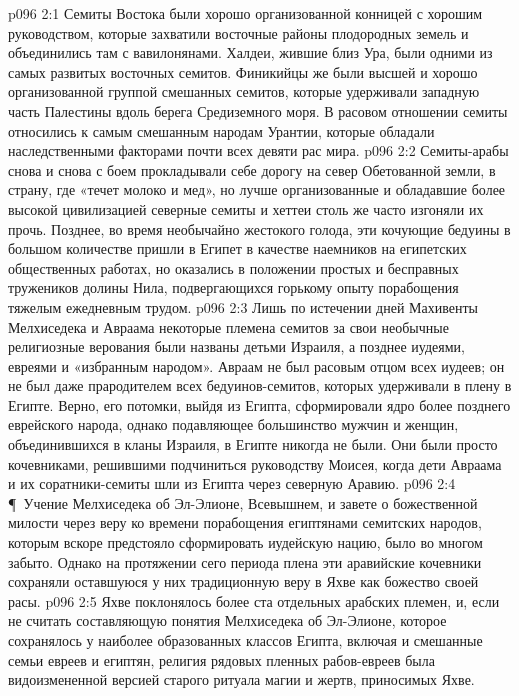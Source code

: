 \vs p096 2:1 Семиты Востока были хорошо организованной конницей с хорошим руководством, которые захватили восточные районы плодородных земель и объединились там с вавилонянами. Халдеи, жившие близ Ура, были одними из самых развитых восточных семитов. Финикийцы же были высшей и хорошо организованной группой смешанных семитов, которые удерживали западную часть Палестины вдоль берега Средиземного моря. В расовом отношении семиты относились к самым смешанным народам Урантии, которые обладали наследственными факторами почти всех девяти рас мира.
\vs p096 2:2 Семиты\hyp{}арабы снова и снова с боем прокладывали себе дорогу на север Обетованной земли, в страну, где «течет молоко и мед», но лучше организованные и обладавшие более высокой цивилизацией северные семиты и хеттеи столь же часто изгоняли их прочь. Позднее, во время необычайно жестокого голода, эти кочующие бедуины в большом количестве пришли в Египет в качестве наемников на египетских общественных работах, но оказались в положении простых и бесправных тружеников долины Нила, подвергающихся горькому опыту порабощения тяжелым ежедневным трудом.
\vs p096 2:3 Лишь по истечении дней Махивенты Мелхиседека и Авраама некоторые племена семитов за свои необычные религиозные верования были названы детьми Израиля, а позднее иудеями, евреями и «избранным народом». Авраам не был расовым отцом всех иудеев; он не был даже прародителем всех бедуинов\hyp{}семитов, которых удерживали в плену в Египте. Верно, его потомки, выйдя из Египта, сформировали ядро более позднего еврейского народа, однако подавляющее большинство мужчин и женщин, объединившихся в кланы Израиля, в Египте никогда не были. Они были просто кочевниками, решившими подчиниться руководству Моисея, когда дети Авраама и их соратники\hyp{}семиты шли из Египта через северную Аравию.
\vs p096 2:4 \P\ Учение Мелхиседека об Эл\hyp{}Элионе, Всевышнем, и завете о божественной милости через веру ко времени порабощения египтянами семитских народов, которым вскоре предстояло сформировать иудейскую нацию, было во многом забыто. Однако на протяжении сего периода плена эти аравийские кочевники сохраняли оставшуюся у них традиционную веру в Яхве как божество своей расы.
\vs p096 2:5 Яхве поклонялось более ста отдельных арабских племен, и, если не считать составляющую понятия Мелхиседека об Эл\hyp{}Элионе, которое сохранялось у наиболее образованных классов Египта, включая и смешанные семьи евреев и египтян, религия рядовых пленных рабов\hyp{}евреев была видоизмененной версией старого ритуала магии и жертв, приносимых Яхве.
